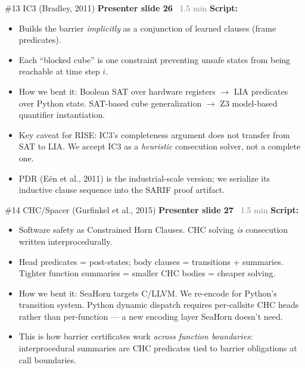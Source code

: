 \documentclass[aspectratio=169]{beamer}
\newcommand{\syncline}[2]{\textbf{#1} \hfill \textcolor{gray}{#2}}
\begin{document}
\begin{frame}{\#13 IC3 (Bradley, 2011)}
\syncline{Presenter slide 26}{~1.5 min}
\textbf{Script:}
\begin{itemize}
  \item Builds the barrier \emph{implicitly} as a conjunction of learned clauses (frame predicates).
  \item Each ``blocked cube'' is one constraint preventing unsafe states from being reachable at time step $i$.
  \item How we bent it: Boolean SAT over hardware registers $\to$ LIA predicates over Python state. SAT-based cube generalization $\to$ Z3 model-based quantifier instantiation.
  \item Key caveat for RISE: IC3's completeness argument does not transfer from SAT to LIA. We accept IC3 as a \emph{heuristic} consecution solver, not a complete one.
  \item PDR (E\'en et al., 2011) is the industrial-scale version; we serialize its inductive clause sequence into the SARIF proof artifact.
\end{itemize}
\end{frame}

\begin{frame}{\#14 CHC/Spacer (Gurfinkel et al., 2015)}
\syncline{Presenter slide 27}{~1.5 min}
\textbf{Script:}
\begin{itemize}
  \item Software safety as Constrained Horn Clauses. CHC solving \emph{is} consecution written interprocedurally.
  \item Head predicates = post-states; body clauses = transitions + summaries. Tighter function summaries = smaller CHC bodies = cheaper solving.
  \item How we bent it: SeaHorn targets C/LLVM. We re-encode for Python's transition system. Python dynamic dispatch requires per-callsite CHC heads rather than per-function --- a new encoding layer SeaHorn doesn't need.
  \item This is how barrier certificates work \emph{across function boundaries}: interprocedural summaries are CHC predicates tied to barrier obligations at call boundaries.
\end{itemize}
\end{frame}

\end{document}
